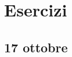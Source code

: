 \documentclass[a4paper]{article}
\begin{document}
%
%

\pagebreak

\section{Esercizi}

\subsection{17 ottobre}

\end{document}
